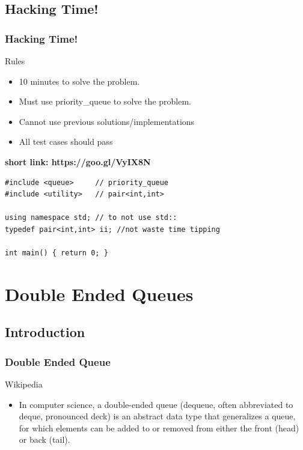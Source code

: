 \documentclass{beamer}
\begin{document}
\subsection{Hacking Time!}
\begin{frame}[fragile]
\frametitle{ Hacking Time! }
\begin{block}{Rules}
	\begin{multicols}{2}
	\begin{itemize}
		\item 10 minutes to solve the problem.
		\item Must use priority\_queue to solve the problem.
		\item Cannot use previous solutions/implementations
		\item All test cases should pass 
	\end{itemize}
	\end{multicols}
	\textbf{short link: https://goo.gl/VyIX8N}
\end{block}
\begin{example}[ Template ]
\begin{lstlisting}
#include <queue>     // priority_queue
#include <utility>   // pair<int,int>

using namespace std; // to not use std::
typedef pair<int,int> ii; //not waste time tipping

int main() { return 0; } 
\end{lstlisting}
\end{example}

\end{frame}
\section{Double Ended Queues} 
\subsection{Introduction}
\begin{frame}
\frametitle{Double Ended Queue}
\begin{block}{Wikipedia}
\begin{itemize}
\item In computer science, a double-ended queue (dequeue, often abbreviated to deque, pronounced deck) is an abstract data type that generalizes a queue, for which elements can be added to or removed from either the front (head) or back (tail). 
\end{itemize}
\end{block}
\end{frame}
\end{document}
